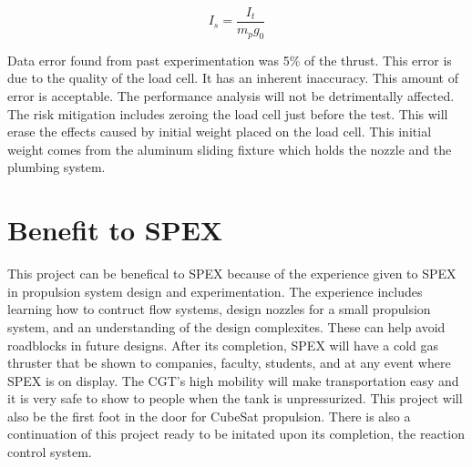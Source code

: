 \documentclass[conference]{IEEEtran} %
\begin{document}
\begin{equation} \label{specific impulse}
  I_s = \frac{I_t}{m_p g_0}
\end{equation}

Data error found from past experimentation was 5\% of the thrust. This error is due to the quality of the load cell. It has an inherent inaccuracy. This
amount of error is acceptable. The performance analysis will not be detrimentally affected. The risk mitigation includes zeroing the load cell just before the test.
This will erase the effects caused by initial weight placed on the load cell. This initial weight comes from the aluminum sliding fixture which holds the nozzle
and the plumbing system.




\section{Benefit to SPEX}
\label{sec:benefit}

This project can be benefical to SPEX because of the experience given to SPEX in propulsion system design and experimentation. The experience includes learning how to contruct flow systems, design nozzles
for a small propulsion system, and an understanding of the design complexites. These can help avoid roadblocks in future designs. After its completion, SPEX will have a cold gas thruster that
be shown to companies, faculty, students, and at any event where SPEX is on display. The CGT's high mobility will make transportation easy and it is very safe to show to people when the tank is unpressurized. This project
will also be the first foot in the door for CubeSat propulsion. There is also a continuation of this project ready to be initated upon its completion, the
reaction control system.
\end{document}
